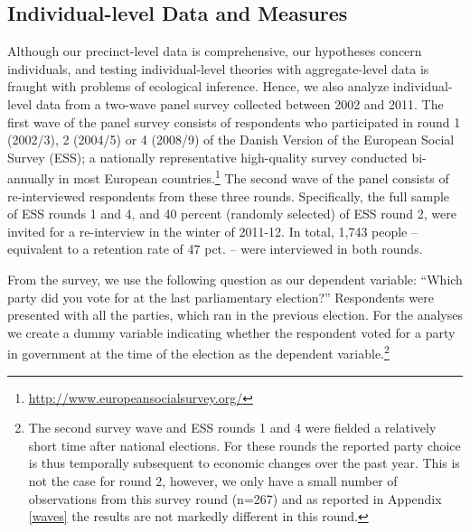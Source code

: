 \documentclass[12pt,a4paper]{article}
\begin{document}
	\subsection{Individual-level Data and Measures}\label{individuallevel}
	Although our precinct-level data is comprehensive, our hypotheses concern individuals, and testing individual-level theories with aggregate-level data is fraught with problems of ecological inference. Hence, we also analyze individual-level data from a two-wave panel survey collected between 2002 and 2011. The first wave of the panel survey consists of respondents who participated in round 1 (2002/3), 2 (2004/5) or 4 (2008/9) of the Danish Version of the European Social Survey (ESS); a nationally representative high-quality survey conducted bi-annually in most European countries.\footnote{\href{http://www.europeansocialsurvey.org/}{http://www.europeansocialsurvey.org/}} The second wave of the panel consists of re-interviewed respondents from these three rounds. Specifically, the full sample of ESS rounds 1 and 4, and 40 percent (randomly selected) of ESS round 2, were invited for a re-interview in the winter of 2011-12. In total, 1,743 people – equivalent to a retention rate of 47 pct. – were interviewed in both rounds. 
	
	From the survey, we use the following question as our dependent variable: ``Which party did you vote for at the last parliamentary election?'' Respondents were presented with all the parties, which ran in the previous election. For the analyses we create a dummy variable indicating whether the respondent voted for a party in government at the time of the election as the dependent variable.\footnote{The second survey wave and ESS rounds 1 and 4  were fielded a relatively short time after national elections. For these rounds the reported party choice is thus temporally subsequent to economic changes over the past year. This is not the case for round 2, however, we only have a small number of observations from this survey round (n=267) and as reported in Appendix \ref{waves} the results are not markedly different in this round.} 
	
\end{document}
